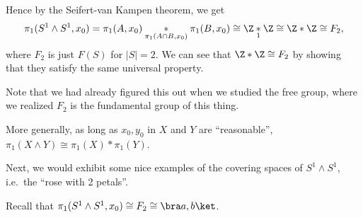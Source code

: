 \documentclass[a4paper]{article}
\begin{document}
\begin{eg}
  Hence by the Seifert-van Kampen theorem, we get
  \[
    \pi_1(S^1 \wedge S^1, x_0) = \pi_1(A, x_0)\underset{\pi_1(A\cap B, x_0)}{*} \pi_1(B, x_0) \cong \Z \underset{1}{*} \Z \cong \Z * \Z \cong F_2,
  \]
  where $F_2$ is just $F(S)$ for $|S| = 2$. We can see that $\Z*\Z \cong F_2$ by showing that they satisfy the same universal property.

  Note that we had already figured this out when we studied the free group, where we realized $F_2$ is the fundamental group of this thing.

  More generally, as long as $x_0, y_0$ in $X$ and $Y$ are ``reasonable'', $\pi_1(X\wedge Y) \cong \pi_1(X) * \pi_1(Y)$.
\end{eg}

Next, we would exhibit some nice examples of the covering spaces of $S^1 \wedge S^1$, i.e.\ the ``rose with 2 petals''.

Recall that $\pi_1(S^1 \wedge S^1, x_0) \cong F_2 \cong \bra a, b\ket$.
\end{document}
